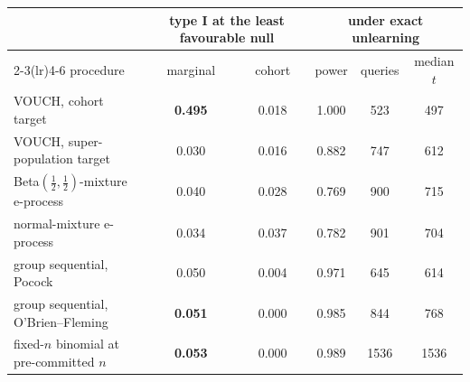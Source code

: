 \begin{tabular}{lccccc}
\toprule
& \multicolumn{2}{c}{type I at the least favourable null} & \multicolumn{3}{c}{under exact unlearning}\\
\cmidrule(lr){2-3}\cmidrule(lr){4-6}
procedure & marginal & cohort & power & queries & median $t$\\
\midrule
VOUCH, cohort target & \textbf{0.495} & 0.018 & 1.000 & 523 & 497\\
VOUCH, super-population target & 0.030 & 0.016 & 0.882 & 747 & 612\\
Beta$(\frac12,\frac12)$-mixture e-process & 0.040 & 0.028 & 0.769 & 900 & 715\\
normal-mixture e-process & 0.034 & 0.037 & 0.782 & 901 & 704\\
group sequential, Pocock & 0.050 & 0.004 & 0.971 & 645 & 614\\
group sequential, O'Brien--Fleming & \textbf{0.051} & 0.000 & 0.985 & 844 & 768\\
fixed-$n$ binomial at pre-committed $n$ & \textbf{0.053} & 0.000 & 0.989 & 1536 & 1536\\
\bottomrule
\end{tabular}
